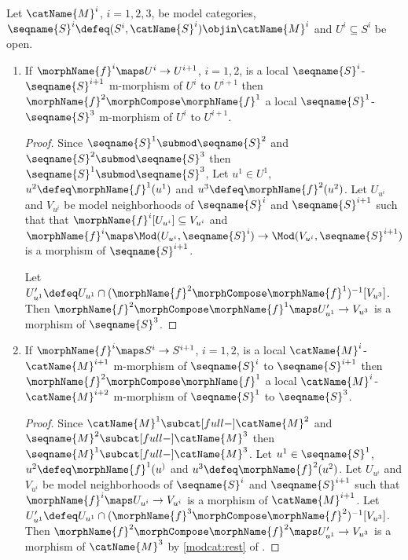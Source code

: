 \documentclass{article}
\begin{document}
\begin{lemma}
\label{lem:modlocalMmorphcomp}
Let $\catName{M}^i$, $i=1,2,3$, be model categories,
$\seqname{S}^i \defeq (S^i, \catName{S}^i) \objin \catName{M}^i$ and
$U^i \subseteq S^i$ be open.

\begin{enumerate}
\item
If $\morphName{f}^i \maps U^i \to U^{i+1}$, $i=1,2$, is a local
$\seqname{S}^i$-$\seqname{S}^{i+1}$ m-morphism of $U^i$ to $U^{i+1}$ then
$\morphName{f}^2 \morphCompose \morphName{f}^1$ a local
$\seqname{S}^1$-$\seqname{S}^3$ m-morphism of $U^i$ to $U^{i+1}$.

\begin{proof}
Since $\seqname{S}^1 \submod \seqname{S}^2$ and
$\seqname{S}^2 \submod \seqname{S}^3$ then
$\seqname{S}^1 \submod \seqname{S}^3$, Let $u^1 \in U^1$,
$u^2 \defeq \morphName{f}^1(u^1)$ and $u^3 \defeq \morphName{f}^2(u^2)$.
Let $U_{u^i}$ and $V_{u^i}$ be model neighborhoods of $\seqname{S}^i$
and $\seqname{S}^{i+1}$ such that that
$\morphName{f}^i[U_{u^i}] \subseteq V_{u^i}$ and
$
  \morphName{f}^i \maps \Mod(U_{u^i},\seqname{S}^i)
  \to \Mod(V_{u^i},\seqname{S}^{i+1})
$
is a morphism of $\seqname{S}^{i+1}$.

Let
$
  U'_{u^1} \defeq
  U_{u^1} \cap (\morphName{f}^2 \morphCompose \morphName{f}^1)^{-1}[V_{u^3}]
$.
Then $\morphName{f}^2 \morphCompose \morphName{f}^1 \maps U'_{u^1} \to V_{u^3}$
is a morphism of $\seqname{S}^3$.
\end{proof}

\item
If $\morphName{f}^i \maps S^i \to S^{i+1}$, $i=1,2$, is a local
$\catName{M}^i$-$\catName{M}^{i+1}$ m-morphism of $\seqname{S}^i$ to
$\seqname{S}^{i+1}$ then $\morphName{f}^2 \morphCompose \morphName{f}^1$ a
local $\catName{M}^i$-$\catName{M}^{i+2}$ m-morphism of
$\seqname{S}^1$ to $\seqname{S}^3$.

\begin{proof}
Since $\catName{M}^1 \subcat[full-] \catName{M}^2$ and
$\seqname{M}^2 \subcat[full-] \catName{M}^3$ then
$\seqname{M}^1 \subcat[full-] \catName{M}^3$.
Let
\nobreaks
  {{
    $u^1 \in \seqname{S}^1$,
  }}
$u^2 \defeq \morphName{f}^1(u^)$ and $u^3 \defeq \morphName{f}^2(u^2)$.
Let $U_{u^i}$ and $V_{u^i}$ be model neighborhoods of $\seqname{S}^i$
and $\seqname{S}^{i+1}$ such that
$\morphName{f}^i \maps U_{u^i} \to V_{u^i}$ is a morphism of
$\catName{M}^{i+1}$. Let
\nobreaks
  {{
    $
      U'_{u^1} \defeq
      U_{u^1} \cap (\morphName{f}^3 \morphCompose \morphName{f}^2)^{-1}[V_{u^3}]
    $.
  }}
Then $\morphName{f}^2 \morphCompose \morphName{f}^2 \maps U'_{u^1} \to V_{u^3}$
is a morphism of $\catName{M}^3$ by
{
  \showlabelsinline
  \cref{modcat:rest}
}
of .
\end{proof}
\end{enumerate}


\end{lemma}
\end{document}
